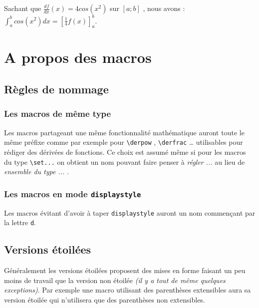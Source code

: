 \documentclass[12pt,a4paper]{article}
\begin{document}
\begin{tcblisting}{}
Sachant que $\displaystyle \frac{df}{dx}(x) = 4 cos(x^2)$ sur $[a ; b]$ , nous avons :
$\displaystyle \int_a^b cos(x^2) dx = \left[ \frac{1}{4} f(x) \right]_a^b$.
\end{tcblisting}



\section{A propos des macros}

\subsection{Règles de nommage}

\subsubsection{Les macros de même \og type \fg}

Les macros partageant une même fonctionnalité mathématique auront toute le même préfixe comme par exemple pour \verb+\derpow+ , \verb+\derfrac+ \dots{} utilisables pour rédiger des dérivées de fonctions.
Ce choix est assumé même si pour les macros du type \verb+\set...+ on obtient un nom pouvant faire penser à \emph{\og régler ... \fg} au lieu de \emph{\og ensemble du type ... \fg}.



\subsubsection{Les macros en mode \texttt{displaystyle}}

Les macros évitant d'avoir à taper \verb+displaystyle+ auront un nom commençant par la lettre \verb+d+.



\subsection{Versions étoilées}

Généralement les versions étoilées proposent des mises en forme faisant un peu moins de travail que la version non étoilée \textit{(il y a tout de même quelques exceptions)}. Par exemple une macro utilisant des parenthèses extensibles aura sa version étoilée qui n'utilisera que des parenthèses non extensibles.
\end{document}
